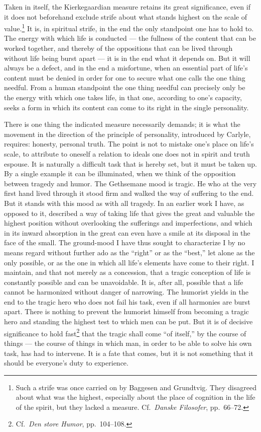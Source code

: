 \documentclass[12pt]{book}
\newcommand{\opage}[1]{\marginnote{\footnotesize\textit{[#1]}}}
\begin{document}
Taken in itself, the Kierkegaardian measure retains its great significance, even if it does not beforehand
exclude strife about what stands highest on the scale of value.\footnote{Such a strife was once carried on
by Baggesen and Grundtvig. They disagreed about what was the highest, especially about the place of
cognition in the life of the spirit, but they lacked a measure. Cf.\ \textit{Danske Filosofer}, pp.\ 66--72.} It is,
in spiritual strife, in the end the only standpoint one has to hold to. The energy with which life is
conducted --- the fullness of the content that can be worked together, and thereby of the oppositions that
can be lived through without life being burst apart --- it is in the end what it depends on. But it will
always be a defect, and in the end a misfortune, when an essential part of life's content must be denied in
order for one to secure what one calls the one thing needful. From a human standpoint the one thing needful
can precisely only be the energy with which one takes life, in that one, according to one's capacity, seeks
a form in which its content can come to its right in the single personality.

There is one thing the indicated measure necessarily demands; it is what the movement in the direction of
the principle of personality, introduced by Carlyle, requires: honesty, personal truth. The point is not to
mistake one's place on life's scale, to attribute to oneself a \opage{61}relation to ideals one does not in spirit and
truth espouse. It is naturally a difficult task that is hereby set, but it must be taken up. By a single
example it can be illuminated, when we think of the opposition between tragedy and humor. The Gethsemane mood
is tragic. He who at the very first hand lived through it stood firm and walked the way of suffering to the
end. But it stands with this mood as with all tragedy. In an earlier work I have, as opposed to it, described
a way of taking life that gives the great and valuable the highest position without overlooking the
sufferings and imperfections, and which in its inward absorption in the great can even have a smile at its
disposal in the face of the small. The ground-mood I have thus sought to characterize I by no means regard
without further ado as the ``right'' or as the ``best,'' let alone as the only possible, or as the one in
which all life's elements have come to their right. I maintain, and that not merely as a concession, that a
tragic conception of life is constantly possible and can be unavoidable. It is, after all, possible that a
life cannot be harmonized without danger of narrowing. The humorist yields in the end to the tragic hero who
does not fail his task, even if all harmonies are burst apart. There is nothing to prevent the humorist
himself from becoming a tragic hero and standing the highest test to which men can be put. But it is of
decisive significance to hold fast\footnote{Cf.\ \textit{Den store Humor}, pp.\ 104--108.} that the tragic
shall come ``of itself,'' by the course of things --- the course of things in which man, in order to be able
to solve his own task, has had to intervene. It is a fate that comes, but it is not something that it should
be everyone's duty to experience.
\end{document}

